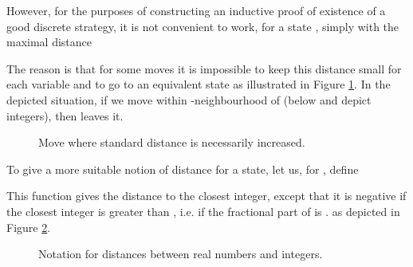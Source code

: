 \documentclass[fleqn,envcountsame]{LMCS}
\newcommand{\ie}{i.e.\xspace}
\begin{document}
However, for the purposes of constructing an inductive proof 
of existence of a good discrete strategy,
it is not convenient to work, for a state , simply with the maximal distance

The reason is that for some moves it is impossible to keep this distance
small for each variable and to go to an equivalent state as illustrated
in Figure \ref{fig-prob}. In the depicted situation, if we move  within
-neighbourhood of  (below  and  depict integers),
then  leaves it.

\begin{figure}[h]
\begin{center}
\end{center}
\caption{Move where standard distance is necessarily increased.}
\label{fig-prob}
\end{figure}

\noindent To give a more suitable notion of distance for a state,
let us, for , define

This function gives the distance to the closest integer, except
that it is negative if the closest integer is greater than ,
\ie if the fractional part of  is .
as depicted in Figure \ref{fig-dist}.


\begin{figure}[h]
\begin{center}
\end{center}
\caption{Notation for distances between real numbers and integers.}
\label{fig-dist}
\end{figure}
\end{document}
